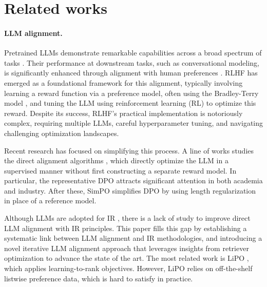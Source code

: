 
\section{Related works}

\paragraph{LLM alignment.}
Pretrained LLMs demonstrate remarkable capabilities across a broad spectrum of tasks \citep{brown2020language}.
Their performance at downstream tasks, such as conversational modeling, is significantly enhanced through alignment with human preferences \citep{ouyang2022training, bai2022training}. 
RLHF \citep{christiano2017deep} has emerged as a foundational framework for this alignment, typically involving learning a reward function via a preference model, often using the Bradley-Terry model \citep{bradley1952rank}, and tuning the LLM using reinforcement learning (RL) to optimize this reward. 
Despite its success, RLHF's practical implementation is notoriously complex, requiring multiple LLMs, careful hyperparameter tuning, and navigating challenging optimization landscapes.

Recent research has focused on simplifying this process. A line of works studies the direct alignment algorithms \citep{zhao2023slic, rafailov2024direct, azar2024general}, which directly optimize the LLM in a supervised manner without first constructing a separate reward model. In particular, the representative DPO \citep{rafailov2024direct} attracts significant attention in both academia and industry. After these, SimPO \citep{meng2024simpo} simplifies DPO by using length regularization in place of a reference model. 

Although LLMs are adopted for IR \citep{tay2022transformer}, there is a lack of study to improve direct LLM alignment with IR principles.
This paper fills this gap by establishing a systematic link between LLM alignment and IR methodologies, and introducing a novel iterative LLM alignment approach that leverages insights from retriever optimization to advance the state of the art.
The most related work is LiPO \citep{liu2024lipo}, which applies learning-to-rank objectives.
However, LiPO relies on off-the-shelf listwise preference data, which is hard to satisfy in practice.

